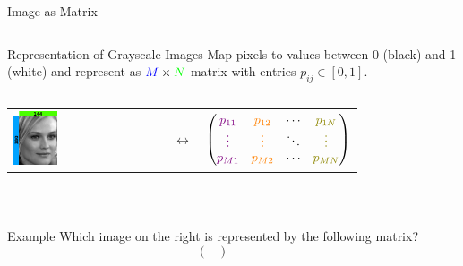 \documentclass[10pt,aspectratio=169,usenames,dvipsnames]{beamer} %
\begin{document}
\begin{frame}[fragile]{Image as Matrix}
\begin{minipage}{0.48\textwidth}
	\begin{columns}[T,onlytextwidth]
		\column{\textwidth}
		\begin{block}{Representation of Grayscale Images}
			Map pixels to values between 0 (black) and 1 (white)
			and represent as $\textcolor{blue}{M}\times\textcolor{green}{N}$
			matrix with entries $p_{ij}\in\left[0,1\right]$.
		\end{block}
	\end{columns}
\end{minipage}\hfill
\begin{minipage}{0.48\textwidth}
	\vspace{0.5cm}
	\begin{tabular}{m{2cm} m{0.5cm} c}
	\includegraphics[width=0.3\textwidth]{images/vectormatrix/ImageToVector} &
	$\longleftrightarrow$ &
	$\begin{pmatrix}
		\textcolor{violet}{p_{11}} & \textcolor{orange}{p_{12}} & \cdots & \textcolor{olive}{p_{1N}} \\
		\textcolor{violet}{\vdots} & \textcolor{orange}{\vdots} & \ddots & \textcolor{olive}{\vdots} \\
		\textcolor{violet}{p_{M1}} & \textcolor{orange}{p_{M2}} & \cdots &  \textcolor{olive}{p_{MN}} \\
	\end{pmatrix}$
\end{tabular}\\[0.5cm]
\pause
\end{minipage}
\begin{minipage}{0.48\textwidth}
	\begin{columns}[T,onlytextwidth]
	\column{\textwidth}
		\begin{block}{Example}
			Which image on the right is represented by the following matrix?
			\begin{equation*}
				\begin{pmatrix}

\end{pmatrix}
\end{equation*}
\end{block}
\end{columns}
\end{minipage}
\end{frame}
\end{document}
